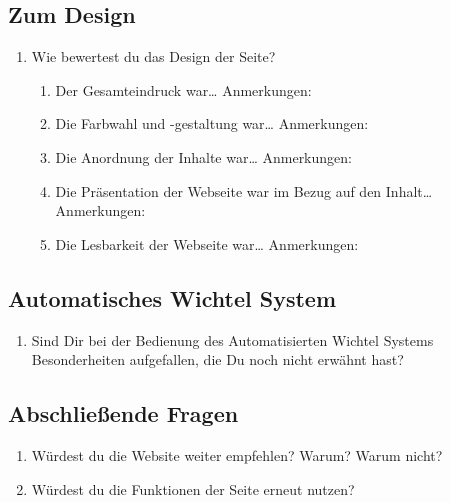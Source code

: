 \subsection{Zum Design}
\begin{enumerate}
\item Wie bewertest du das Design der Seite?
\begin{enumerate}
\item Der Gesamteindruck war…
Anmerkungen:
\interviewText{\interviewTextM}
\item Die Farbwahl und -gestaltung war…
Anmerkungen:
\interviewText{\interviewTextM}
\clearpage
\item Die Anordnung der Inhalte war…
Anmerkungen:
\interviewText{\interviewTextM}
\item Die Präsentation der Webseite war im Bezug auf den Inhalt…
Anmerkungen:
\interviewText{\interviewTextM}
\item Die Lesbarkeit der Webseite war…
Anmerkungen:
\interviewText{\interviewTextM}
\end{enumerate}
\end{enumerate}

\clearpage
\subsection{Automatisches Wichtel System}
\begin{enumerate}
\item Sind Dir bei der Bedienung des Automatisierten Wichtel Systems Besonderheiten aufgefallen, die Du noch nicht erwähnt hast?
\interviewText{\interviewTextL}
\end{enumerate}

\subsection{Abschließende Fragen}
\begin{enumerate}
\item Würdest du die Website weiter empfehlen? Warum? Warum nicht?
\interviewText{\interviewTextL}
\item Würdest du die Funktionen der Seite erneut nutzen?
\interviewText{\interviewTextL}
\end{enumerate}